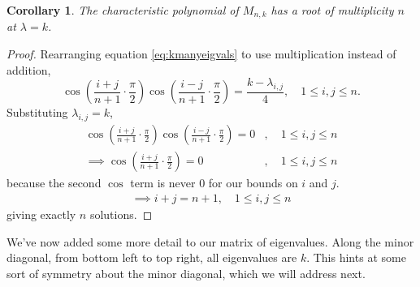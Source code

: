 \documentclass[12pt]{article}
\newtheorem{corollary}{Corollary}
\begin{document}
	\begin{corollary}\label{cor:charpolymultiplicity}
		The characteristic polynomial of $M_{n,k}$ has a root of multiplicity $n$ at
		$\lambda = k$.
	\end{corollary}
	\begin{proof}
		Rearranging equation \eqref{eq:kmanyeigvals} to use multiplication instead of
		addition,
		\begin{equation}\label{eq:kmanyeigvals_mult}
			\cos{\left(\frac{i+j}{n+1}\cdot\frac{\pi}{2}\right)}\cos{\left(\frac{i-j}{n+1}\cdot\frac{\pi}{2}\right)} = \frac{k-\lambda_{i,j}}{4}, \hspace{12pt} 1\leq i,j \leq n.
		\end{equation}
		Substituting $\lambda_{i,j} = k$,
		\begin{align*}	
			\cos{\left(\frac{i+j}{n+1}\cdot\frac{\pi}{2}\right)}\cos{\left(\frac{i-j}{n+1}\cdot\frac{\pi}{2}\right)}
			= 0&, \hspace{12pt} 1\leq i,j \leq n \\
			\implies \cos{\left(\frac{i+j}{n+1}\cdot\frac{\pi}{2}\right)} = 0&,
			\hspace{12pt} 1\leq i,j \leq n
		\end{align*}
		because the second $\cos$ term is never $0$ for our bounds on $i$ and $j$.
		\begin{align*}
		\implies i+j = n+1, \hspace{12pt} 1\leq i,j \leq n
		\end{align*}
		giving exactly $n$ solutions.
	\end{proof}
	We've now added some more detail to our matrix of eigenvalues.
	Along the minor diagonal, from bottom left to top right, all eigenvalues are
	$k$.
	This hints at some sort of symmetry about the minor diagonal, which we will
	address next.
	
\end{document}
